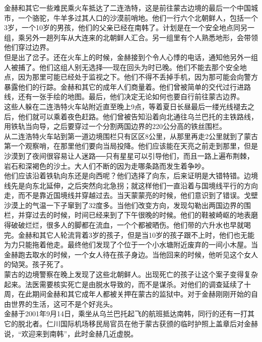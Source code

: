 金赫和其它一些难民乘火车抵达了二连浩特，这是前往蒙古边境的最后一个中国城市，一个骆驼，牛羊多过其人口的沙漠前哨地。他们一行六个北朝鲜人，包括一个3岁，一个10岁的男孩，他们的父亲已经在南韩了。计划是在一个安全地点同另一组，乘另外一趟列车从大连来的北朝鲜人汇合。另一组里有个人熟悉地形，会带领他们穿过边界。\\

但是出了岔子。还在火车上的时候，金赫接到个令人心悸的电话，通知他另外一组人被捕了。他们这组人别无选择──现在回头为时已晚。他们不能去那个安全地点，因为那里可能已经处于监视之下。他们不得不丢掉手机，因为那可能会向警方暴露他们的行踪。金赫和其它的成年人们商量着。他们曾被简单的交代过行进路线，还有一张手绘的地图。最后，他们决定无论如何也要自行前往蒙古边界。\\

这些人躲在二连浩特火车站附近直至晚上9点，等着夏日长昼最后一缕光线褪去之后，他们就可以乘着夜色赶路。他们曾被告知沿着向北通往乌兰巴托的主铁路线，用铁轨当向导，之后要穿过一个分割两国边界的220公分高的铁丝围栏。\\

从二连浩特火车站到第一道边境围栏只有区区8公里，从那里再走2公里就到了蒙古第一个观察哨，在那里他们要向当局投降。他们应该能在天亮之前走到那里，但是沙漠到了夜间很容易让人迷路──只有星星可以引导他们，而且一路上遍布荆棘，岩石和深褐色的沙土。大人们不断的因为走哪条路而发生着争吵。\\

他们应该沿着铁轨向东还是向西呢？他们选择了向东，后来证明是大错特错。边境线先是向东北延伸，之后突然向北急拐；就这样他们一直沿着与国境线平行的方向走，而不是靠近国境线并穿越过去。当天蒙蒙亮的时候，他们意识到了错误。戈壁沙漠上的气温一下子窜到了32度多。当他们改变方向，发现勾勒出两国边界的围栏，并穿过去的时候，时间已经来到了下午很晚的时候。他们的鞋被崎岖的地表磨得破破烂烂，很多人的脚都在流血，一个个都被晒伤。他们带的六升水也早就喝完。金赫和其它人轮流背着3岁的孩子，但是当10岁的孩子跟不上时，他们也无能为力只能拖着他走。最终他们发现了个位于一个小水塘附近废弃的一间小木屋。当金赫跑去取水的时候，一个女人待在孩子身边。当他回来的时候，他听见这个女人的恸哭。孩子死了。\\

蒙古的边境警察在晚上发现了这些北朝鲜人。出现死亡的孩子让这个案子变得复杂起来。法医需要核实死亡是由脱水导致的，而不是谋杀。对他们的调查延续了十周，在此期间金赫和其它成年人都被关押在蒙古的监狱中。对于金赫刚刚开始的自由世界的生活，这可不是个好兆头。\\

金赫于2001年9月14日，乘坐从乌兰巴托起飞的航班抵达南韩，同行的还有一打其它的脱北者。仁川国际机场移民局官员在他于蒙古获颁的临时护照上盖章后对金赫说，“欢迎来到南韩”，此时金赫几近虚脱。\\

